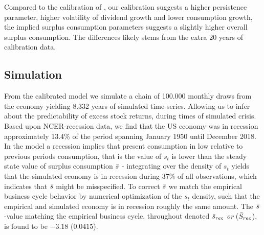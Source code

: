 %


Compared to the calibration of \citet{Campbell1999}, our calibration suggests a higher persistence parameter, higher volatility of dividend growth and lower consumption growth, the implied surplus consumption parameters suggests a slightly higher overall surplus consumption. The differences likely stems from the extra 20 years of calibration data. \\
\subsection{Simulation}
From the calibrated model we simulate a chain of 100.000 monthly draws from the economy yielding 8.332 years of simulated time-series. Allowing us to infer about the predictability of excess stock returns, during times of simulated crisis. \\
\newline
Based upon NCER-recession data, we find that the US economy was in recession approximately 13.4\% of the period spanning January 1950 until December 2018.  In the model a recession implies that present consumption in low relative to previous periods consumption, that is the value of $s_t$ is lower than the steady state value of surplus consumption $\Bar{s}$ - integrating over the density of $s_t$ yields that the simulated economy is in recession during 37\% of all observations, which indicates that $\Bar{s}$ might be misspecified. To correct $\Bar{s}$ we match the empirical business cycle behavior by numerical optimization of the $s_t$ density, such that the empirical and simulated economy is in recession roughly the same amount. The $\Bar{s}$-value matching the empirical business cycle, throughout denoted $\Bar{s}_{rec}$ \textit{or} ($\Bar{S}_{rec}$), is found to be $-3.18$ ($0.0415$).



